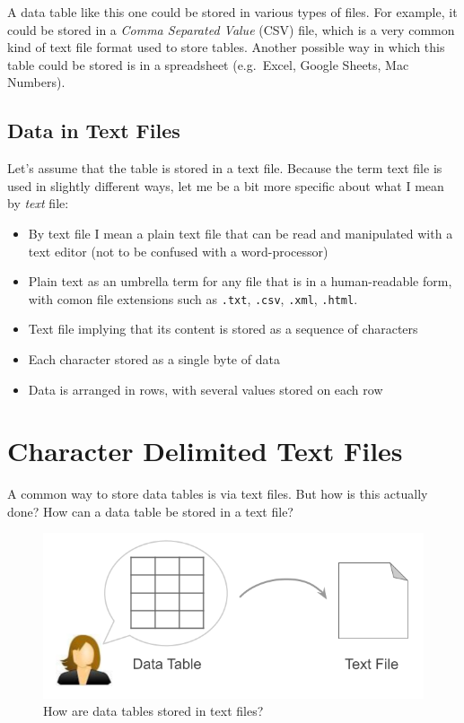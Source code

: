 \documentclass[
]{book}
\begin{document}
A data table like this one could be stored in various types of files. For
example, it could be stored in a \emph{Comma Separated Value} (CSV) file, which is a
very common kind of text file format used to store tables. Another possible way
in which this table could be stored is in a spreadsheet (e.g.~Excel, Google
Sheets, Mac Numbers).

\hypertarget{data-in-text-files}{%
\subsection{Data in Text Files}\label{data-in-text-files}}

Let's assume that the table is stored in a text file. Because the term text
file is used in slightly different ways, let me be a bit more specific about
what I mean by \emph{text} file:

\begin{itemize}
\item
  By text file I mean a plain text file that can be read and manipulated with a
  text editor (not to be confused with a word-processor)
\item
  Plain text as an umbrella term for any file that is in a human-readable form,
  with comon file extensions such as \texttt{.txt}, \texttt{.csv}, \texttt{.xml}, \texttt{.html}.
\item
  Text file implying that its content is stored as a sequence of characters
\item
  Each character stored as a single byte of data
\item
  Data is arranged in rows, with several values stored on each row
\end{itemize}

\hypertarget{character-delimited-text-files}{%
\section{Character Delimited Text Files}\label{character-delimited-text-files}}

A common way to store data tables is via text files. But how is this actually
done? How can a data table be stored in a text file?

\begin{figure}

{\centering \includegraphics[width=0.65\linewidth]{images/inout/table-storing-data} 

}

\caption{How are data tables stored in text files?}\label{fig:unnamed-chunk-364}
\end{figure}
\end{document}
